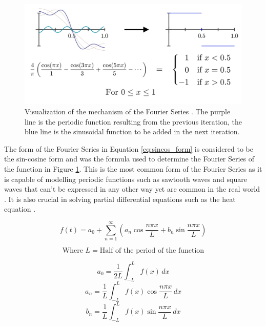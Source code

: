 \documentclass[letterpaper, 12pt]{article}
\begin{document}
\begin{figure}[H]
    \centering
    \includegraphics[width=.8\textwidth]{fourier_basic_visual.png}
    \caption{Visualization of the mechanism of the Fourier Series \protect\cite{sandersonWhatFourierSeries2019}. The purple line is the periodic function resulting from the previous iteration, the blue line is the sinusoidal function to be added in the next iteration.}
    \label{fig:fourier_visual}
\end{figure}

The form of the Fourier Series in Equation \ref*{eq:sincos_form} is considered
to be the sin-cosine form and was the formula used to determine
the Fourier Series of the function in Figure \ref*{fig:fourier_visual}.
This is the most common form of the Fourier Series
as it is capable of modelling periodic functions such as
sawtooth waves and square waves that can't be expressed
in any other way yet are common in the real world \cite{FourierSeriesDefinition}.
It is also crucial in solving partial differential equations
such as the heat equation \cite{sandersonWhatFourierSeries2019}.

\begin{equation}
    \label{eq:sincos_form}
    f(t) = a_0 + \sum_{n=1}^{\infty} (a_n \cos \frac{n\pi x}{L} + b_n \sin \frac{n\pi x}{L})
\end{equation}

\[
    \text{Where } L = \text{Half of the period of the function}
\]

\begin{equation}
    \label{eq:a_not}
    a_0 = \frac{1}{2L} \int_{-L}^{L} f(x) \,dx
\end{equation}
\begin{equation}
    \label{eq:a_n}
    a_n = \frac{1}{L} \int_{-L}^{L} f(x) \cos \frac{n\pi x}{L} \,dx
\end{equation}
\begin{equation}
    \label{eq:b_n}
    b_n = \frac{1}{L} \int_{-L}^{L} f(x) \sin \frac{n\pi x}{L} \,dx
\end{equation}
\end{document}
